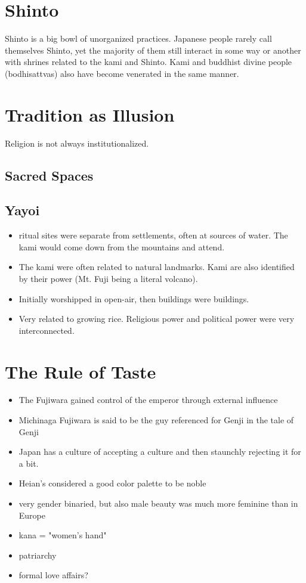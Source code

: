 \documentclass{report}
\begin{document}
\section*{Shinto}
Shinto is a big bowl of unorganized practices. Japanese people rarely call themselves Shinto, yet the majority of them still interact in some way or another with shrines related to the kami and Shinto. Kami and buddhist divine people (bodhisattvas) also have become venerated in the same manner.

\section{Tradition as Illusion}
Religion is not always institutionalized.

\subsection*{Sacred Spaces}
\subsection*{Yayoi}
\begin{itemize}
\item
ritual sites were separate from settlements, often at sources of water. The kami would come down from the mountains and attend.
\item
The kami were often related to natural landmarks. Kami are also identified by their power (Mt. Fuji being a literal volcano).

\item
Initially worshipped in open-air, then buildings were buildings.

\item
Very related to growing rice. Religious power and political power were very interconnected.
\end{itemize}


\section{The Rule of Taste}
\begin{itemize}
\item
The Fujiwara gained control of the emperor through external influence
\item
Michinaga Fujiwara is said to be the guy referenced for Genji in the tale of Genji
\item
Japan has a culture of accepting a culture and then staunchly rejecting it for a bit.
\item
Heian's considered a good color palette to be noble
\item 
very gender binaried, but also male beauty was much more feminine than in Europe
\item
kana = "women's hand"
\item
patriarchy
\item
formal love affairs?
\end{itemize}
\end{document}

